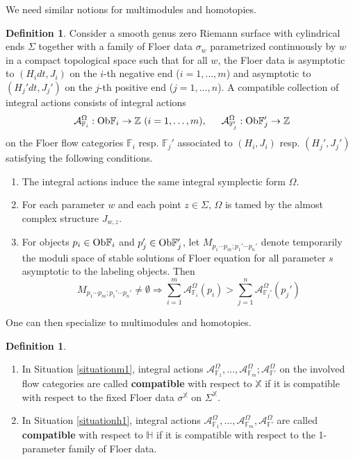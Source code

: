 \documentclass[reqno, 10pt]{amsart}
\numberwithin{equation}{section}
\numberwithin{equation}{section}
\theoremstyle{definition}
\newtheorem{defn}[thm]{Definition}
\theoremstyle{remark}
\newcommand{\beqn}{\begin{equation*}}
\newcommand{\eeqn}{\end{equation*}}
\newcommand{\mb}{\mathbb}
\newcommand{\mc}{\mathcal}
\begin{document}
We need similar notions for multimodules and homotopies. 


\begin{defn}\label{module_integral_action}
Consider a smooth genus zero Riemann surface with cylindrical ends $\Sigma$ together with a family of Floer data $\sigma_w$ parametrized continuously by $w$ in a compact topological space such that for all $w$, the Floer data is asymptotic to $(H_i dt, J_i)$ on the $i$-th negative end ($i = 1, \ldots, m$) and asymptotic to $(H_j' dt, J_j')$ on the $j$-th positive end ($j=1, \ldots, n$). A compatible collection of integral actions consists of integral actions 
\begin{align*}
&\ {\mc A}_{{\mb F}_i}^\Omega: {\rm Ob} {\mb F}_i \to {\mb Z}\  (i=1, \ldots, m),\ &\ {\mc A}_{{\mb F}_j'}^\Omega: {\rm Ob}{\mb F}_j' \to {\mb Z}
\end{align*}
on the Floer flow categories ${\mb F}_i$ resp. ${\mb F}_j'$ associated to $(H_i, J_i)$ resp. $(H_j', J_j')$ satisfying the following conditions.
\begin{enumerate}

\item The integral actions induce the same integral symplectic form $\Omega$.

\item For each parameter $w$ and each point $z \in \Sigma$, $\Omega$ is tamed by the almost complex structure $J_{w, z}$.

\item For objects $p_i \in {\rm Ob}{\mb F}_i$ and $p_j' \in {\rm Ob}{\mb F}_j'$, let $M_{p_1\cdots p_m; p_1'\cdots p_n'}$ denote temporarily the moduli space of stable solutions of Floer equation for all parameter $s$ asymptotic to the labeling objects. Then
\beqn
M_{p_1 \cdots p_m; p_1'\cdots p_n'} \neq \emptyset \Longrightarrow \sum_{i=1}^m {\mc A}_{{\mb F}_i}^\Omega(p_i) > \sum_{j=1}^n {\mc A}_{{\mb F}_j'}^\Omega(p_j')
\eeqn
\end{enumerate}
\end{defn}

One can then specialize to multimodules and homotopies. 

\begin{defn}
\begin{enumerate}

\item In Situation \ref{situationm1}, integral actions ${\mc A}_{{\mb F}_1}^\Omega, \ldots, {\mc A}_{{\mb F}_m}^\Omega; {\mc A}_{{\mb F}'}^\Omega$ on the involved flow categories are called {\bf compatible} with respect to ${\mb X}$ if it is compatible with respect to the fixed Floer data $\sigma^{\mb X}$ on $\Sigma^{\mb X}$.

\item In Situation \ref{situationh1}, integral actions ${\mc A}_{{\mb F}_1}^\Omega, \ldots, {\mc A}_{{\mb F}_m}^\Omega, {\mc A}_{{\mb F}'}^\Omega$ are called {\bf compatible} with respect to ${\mb H}$ if it is compatible with respect to the 1-parameter family of Floer data. 

\end{enumerate}
\end{defn}
\end{document}
